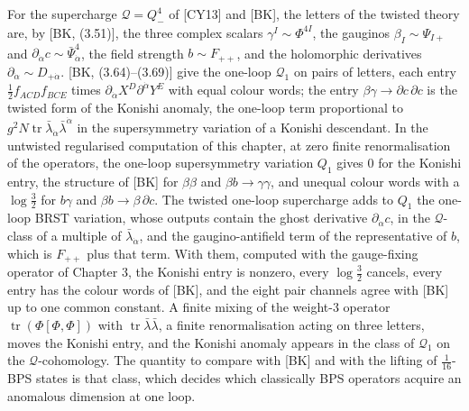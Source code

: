 \begin{remark}
For the supercharge $\mathcal Q=Q^4_-$ of [CY13] and [BK], the letters of the twisted theory are, by [BK, (3.51)], the three complex scalars $\gamma^I\sim\Phi^{4I}$, the gauginos $\beta_I\sim\Psi_{I+}$ and $\partial_{\dot\alpha}c\sim\bar\Psi^4_{\dot\alpha}$, the field strength $b\sim F_{++}$, and the holomorphic derivatives $\partial_{\dot\alpha}\sim D_{+\dot\alpha}$. [BK, (3.64)--(3.69)] give the one-loop $\mathcal Q_1$ on pairs of letters, each entry $\tfrac12f_{ACD}f_{BCE}$ times $\partial_{\dot\alpha}X^D\partial^{\dot\alpha}Y^E$ with equal colour words; the entry $\beta\gamma\to\partial c\,\partial c$ is the twisted form of the Konishi anomaly, the one-loop term proportional to $g^2N\operatorname{tr}\bar\lambda_{\dot\alpha}\bar\lambda^{\dot\alpha}$ in the supersymmetry variation of a Konishi descendant. In the untwisted regularised computation of this chapter, at zero finite renormalisation of the operators, the one-loop supersymmetry variation $Q_1$ gives $0$ for the Konishi entry, the structure of [BK] for $\beta\beta$ and $\beta b\to\gamma\gamma$, and unequal colour words with a $\log\tfrac32$ for $b\gamma$ and $\beta b\to\beta\,\partial c$. The twisted one-loop supercharge adds to $Q_1$ the one-loop BRST variation, whose outputs contain the ghost derivative $\partial_{\dot\alpha}c$, in the $\mathcal Q$-class of a multiple of $\bar\lambda_{\dot\alpha}$, and the gaugino-antifield term of the representative of $b$, which is $F_{++}$ plus that term. With them, computed with the gauge-fixing operator of Chapter 3, the Konishi entry is nonzero, every $\log\tfrac32$ cancels, every entry has the colour words of [BK], and the eight pair channels agree with [BK] up to one common constant. A finite mixing of the weight-$3$ operator $\operatorname{tr}(\Phi[\Phi,\Phi])$ with $\operatorname{tr}\bar\lambda\bar\lambda$, a finite renormalisation acting on three letters, moves the Konishi entry, and the Konishi anomaly appears in the class of $\mathcal Q_1$ on the $\mathcal Q$-cohomology. The quantity to compare with [BK] and with the lifting of $\tfrac1{16}$-BPS states is that class, which decides which classically BPS operators acquire an anomalous dimension at one loop.
\end{remark}
